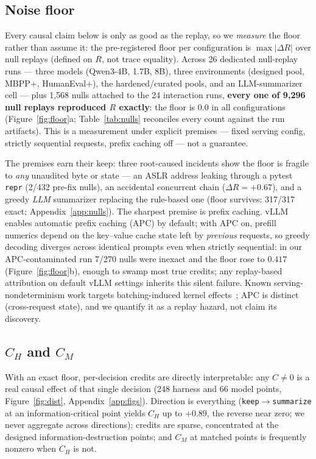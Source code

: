 \documentclass{article}
\theoremstyle{remark}
\begin{document}
\subsection{Noise floor}
\label{sec:floor}
Every causal claim below is only as good as the replay, so we
\emph{measure} the floor rather than assume it: the pre-registered floor
per configuration is $\max |\Delta R|$ over null replays (defined on $R$,
not trace equality).
Across 26 dedicated null-replay runs --- three models (Qwen3-4B, 1.7B,
8B), three environments (designed pool, MBPP+, HumanEval+), the
hardened/curated pools, and an LLM-summarizer cell --- plus 1{,}568 nulls
attached to the 24 interaction runs, \textbf{every one of 9{,}296 null
replays reproduced $R$ exactly}: the floor is $0.0$ in all configurations
(Figure~\ref{fig:floor}a; Table~\ref{tab:nulls} reconciles every count
against the run artifacts). This is a measurement under explicit premises
--- fixed serving config, strictly sequential requests, prefix caching off
--- not a guarantee.

The premises earn their keep: three root-caused incidents show the floor
is fragile to \emph{any} unaudited byte or state --- an ASLR address
leaking through a pytest \texttt{repr} (2/432 pre-fix nulls), an
accidental concurrent chain ($\Delta R = +0.67$), and a greedy
\emph{LLM} summarizer replacing the rule-based one (floor survives:
317/317 exact; Appendix~\ref{app:nulls}).
The sharpest premise is prefix caching. vLLM enables automatic prefix
caching (APC) by default; with APC on, prefill numerics depend on the
key--value cache state left by \emph{previous} requests, so greedy
decoding diverges across identical prompts even when strictly
sequential: in our APC-contaminated run 7/270 nulls were inexact and the
floor rose to $0.417$ (Figure~\ref{fig:floor}b), enough to swamp most
true credits; any replay-based attribution on default vLLM settings
inherits this silent failure. Known serving-nondeterminism work targets
batching-induced kernel effects~\citep{he2025nondeterminism}; APC is
distinct (cross-request state), and we quantify it as a replay hazard,
not claim its discovery.


\subsection{$C_H$ and $C_M$}
With an exact floor, per-decision credits are directly interpretable: any
$C \neq 0$ is a real causal effect of that single decision (248 harness
and 66 model points, Figure~\ref{fig:dist}, Appendix~\ref{app:figs}).
Direction is everything (\texttt{keep}$\to$\texttt{summarize} at an
information-critical point yields $C_H$ up to $+0.89$, the reverse near
zero; we never aggregate across directions); credits are sparse,
concentrated at the designed information-destruction points; and $C_M$
at matched points is frequently nonzero when $C_H$ is not.
\end{document}
